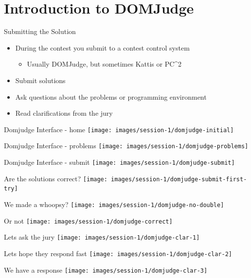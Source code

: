 \documentclass[11pt,pdf, aspectratio=169]{beamer}
\begin{document}
  \section{Introduction to DOMJudge}
  \begin{frame}{Submitting the Solution}
    \begin{itemize}
      \item During the contest you submit to a contest control system
      \begin{itemize}
        \item Usually DOMJudge, but sometimes Kattis or PC\textasciicircum2
      \end{itemize}
      \item Submit solutions
      \item Ask questions about the problems or programming environment
      \item Read clarifications from the jury
    \end{itemize}
  \end{frame}
  \begin{frame}{Domjudge Interface - home}
    \texttt{[image: images/session-1/domjudge-initial]}
  \end{frame}
  \begin{frame}{Domjudge Interface - problems}
    \texttt{[image: images/session-1/domjudge-problems]}
  \end{frame}
  \begin{frame}{Domjudge Interface - submit}
    \texttt{[image: images/session-1/domjudge-submit]}
  \end{frame}
  \begin{frame}{Are the solutions correct?}
    \texttt{[image: images/session-1/domjudge-submit-first-try]}
  \end{frame}
  \begin{frame}{We made a whoopsy?}
    \texttt{[image: images/session-1/domjudge-no-double]}
  \end{frame}
  \begin{frame}{Or not}
    \texttt{[image: images/session-1/domjudge-correct]}
  \end{frame}
  \begin{frame}{Lets ask the jury}
    \texttt{[image: images/session-1/domjudge-clar-1]}
  \end{frame}
  \begin{frame}{Lets hope they respond fast}
    \texttt{[image: images/session-1/domjudge-clar-2]}
  \end{frame}
  \begin{frame}{We have a response}
    \texttt{[image: images/session-1/domjudge-clar-3]}
  \end{frame}
\end{document}
